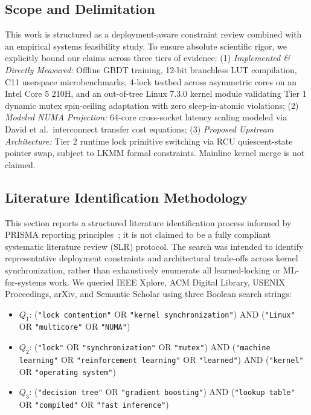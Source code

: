 \documentclass[conference]{IEEEtran}
\begin{document}
\subsection{Scope and Delimitation}
This work is structured as a deployment-aware constraint review combined with an empirical systems feasibility study. To ensure absolute scientific rigor, we explicitly bound our claims across three tiers of evidence: (1) \textit{Implemented \& Directly Measured:} Offline GBDT training, 12-bit branchless LUT compilation, C11 userspace microbenchmarks, 4-lock testbed across asymmetric cores on an Intel Core 5 210H, and an out-of-tree Linux 7.3.0 kernel module validating Tier 1 dynamic mutex spin-ceiling adaptation with zero sleep-in-atomic violations; (2) \textit{Modeled NUMA Projection:} 64-core cross-socket latency scaling modeled via David et al.\ interconnect transfer cost equations; (3) \textit{Proposed Upstream Architecture:} Tier 2 runtime lock primitive switching via RCU quiescent-state pointer swap, subject to LKMM formal constraints. Mainline kernel merge is not claimed.

\subsection{Literature Identification Methodology}
This section reports a structured literature identification process informed by PRISMA reporting principles~\cite{cho2022survey}; it is not claimed to be a fully compliant systematic literature review (SLR) protocol. The search was intended to identify representative deployment constraints and architectural trade-offs across kernel synchronization, rather than exhaustively enumerate all learned-locking or ML-for-systems work. We queried IEEE Xplore, ACM Digital Library, USENIX Proceedings, arXiv, and Semantic Scholar using three Boolean search strings:
\begin{itemize}
    \item $Q_1$: (\texttt{"lock contention"} OR \texttt{"kernel synchronization"}) AND (\texttt{"Linux"} OR \texttt{"multicore"} OR \texttt{"NUMA"})
    \item $Q_2$: (\texttt{"lock"} OR \texttt{"synchronization"} OR \texttt{"mutex"}) AND (\texttt{"machine learning"} OR \texttt{"reinforcement learning"} OR \texttt{"learned"}) AND (\texttt{"kernel"} OR \texttt{"operating system"})
    \item $Q_3$: (\texttt{"decision tree"} OR \texttt{"gradient boosting"}) AND (\texttt{"lookup table"} OR \texttt{"compiled"} OR \texttt{"fast inference"})
\end{itemize}
\end{document}
